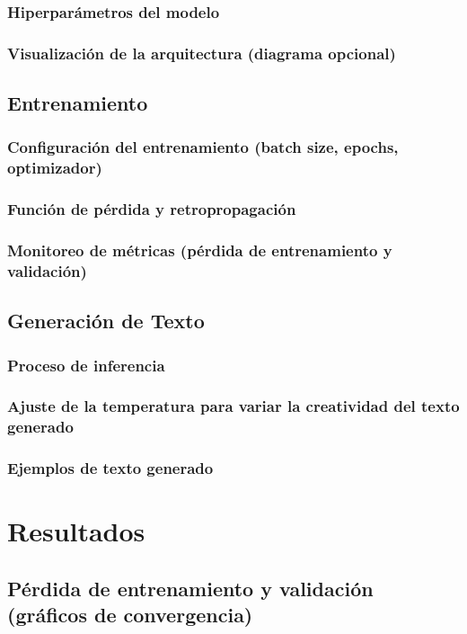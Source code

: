 \documentclass{article}
\begin{document}
\subsubsection{Hiperparámetros del modelo}
\subsubsection{Visualización de la arquitectura (diagrama opcional)}

\subsection{Entrenamiento}
\subsubsection{Configuración del entrenamiento (batch size, epochs, optimizador)}
\subsubsection{Función de pérdida y retropropagación}
\subsubsection{Monitoreo de métricas (pérdida de entrenamiento y validación)}

\subsection{Generación de Texto}
\subsubsection{Proceso de inferencia}
\subsubsection{Ajuste de la temperatura para variar la creatividad del texto generado}
\subsubsection{Ejemplos de texto generado}

\section{Resultados}
\subsection{Pérdida de entrenamiento y validación (gráficos de convergencia)}
\end{document}
